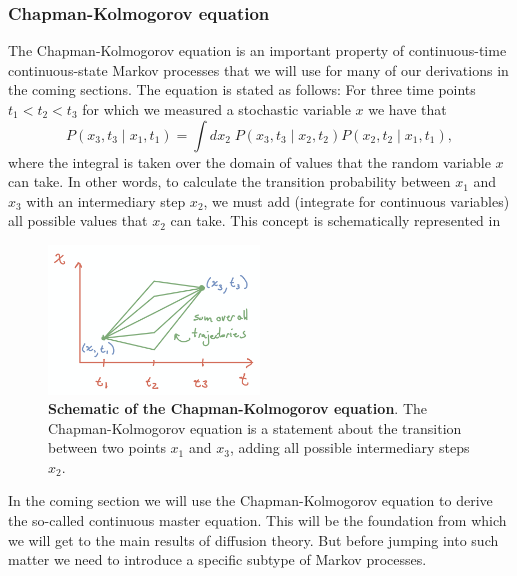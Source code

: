 \subsubsection{Chapman-Kolmogorov equation} \label{sec_chapman_kolmogorov}

The Chapman-Kolmogorov equation is an important property of continuous-time
continuous-state Markov processes that we will use for many of our derivations
in the coming sections. The equation is stated as follows: For three time points
$t_1 < t_2 < t_3$ for which we measured a stochastic variable $x$ we have that
\begin{equation}
  P(x_3, t_3 \mid x_1, t_1) = \int dx_2\; P(x_3, t_3 \mid x_2, t_2)
                                          P(x_2, t_2 \mid x_1, t_1),
\end{equation}
where the integral is taken over the domain of values that the random variable
$x$ can take. In other words, to calculate the transition probability between
$x_1$ and $x_3$ with an intermediary step $x_2$, we must add (integrate for
continuous variables) all possible values that $x_2$ can take. This concept is
schematically represented in 

\begin{figure}[h!]
	\centering \includegraphics[width=0.5\textwidth]
  {../../fig/classic_diffusion/03_02_01_chapman_kolmogorov.png}
	\caption{\textbf{Schematic of the Chapman-Kolmogorov equation}. The
  Chapman-Kolmogorov equation is a statement about the transition between two
  points $x_1$ and $x_3$, adding all possible intermediary steps $x_2$.}
  \label{fig_chapman_kolmogorov}
\end{figure}

In the coming section we will use the Chapman-Kolmogorov equation to derive the
so-called continuous master equation. This will be the foundation from which we
will get to the main results of diffusion theory. But before jumping into such
matter we need to introduce a specific subtype of Markov processes.

